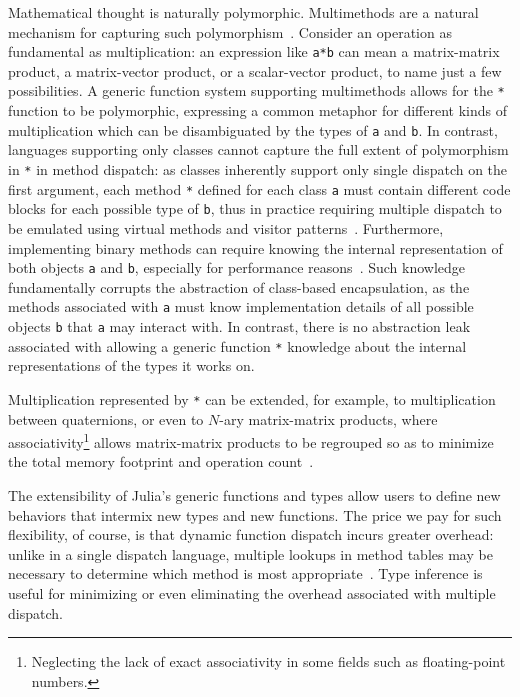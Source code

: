 \documentclass[10pt, preprint]{sigplanconf}
\begin{document}
Mathematical thought is
naturally polymorphic. Multimethods are a natural mechanism for capturing such
polymorphism~\cite{Bezanson2014b,Chen2014}. Consider an operation as
fundamental as multiplication: an expression like \verb|a*b| can mean a matrix-matrix product, a matrix-vector product, or a scalar-vector product, to name just a few possibilities. A generic function system supporting
multimethods allows for the \verb|*| function to be polymorphic, expressing a
common metaphor for different kinds of multiplication which can be
disambiguated by the types of \verb|a| and \verb|b|. In contrast, languages
supporting only classes cannot capture the full extent of polymorphism in
\verb|*| in method dispatch: as classes inherently support only single dispatch
on the first argument, each method \verb|*| defined for each class \verb|a|
must contain different code blocks for each possible type of \verb|b|, thus in
practice requiring multiple dispatch to be emulated using virtual methods and
visitor patterns~\cite{designpatterns}. Furthermore, implementing binary methods can
require knowing the internal representation of both objects \verb|a| and
\verb|b|, especially for performance reasons~\cite{Bruce1995}. Such knowledge
fundamentally corrupts the abstraction of class-based encapsulation, as the
methods associated with \verb|a| must know implementation details of all
possible objects \verb|b| that \verb|a| may interact with.
In contrast, there is no abstraction leak associated with allowing a generic
function \verb|*| knowledge about the internal representations of the types it
works on.

Multiplication represented by \verb|*| can be extended, for
example, to multiplication between quaternions, or even to $N$-ary
matrix-matrix products, where associativity\footnote{Neglecting the lack of
exact associativity in some fields such as floating-point numbers.} allows
matrix-matrix products to be regrouped so as to minimize the total memory
footprint and operation count~\cite{Hu1984}.

The extensibility of Julia's generic functions and types allow users to
define new behaviors that intermix new types and new functions. The price we pay
for such flexibility, of course, is that dynamic function dispatch incurs
greater overhead: unlike in a single dispatch language, multiple lookups in
method tables may be necessary to determine which method is most
appropriate~\cite{Bruce1995}. Type inference is
useful for minimizing or even eliminating the
overhead associated with multiple dispatch.
\end{document}
